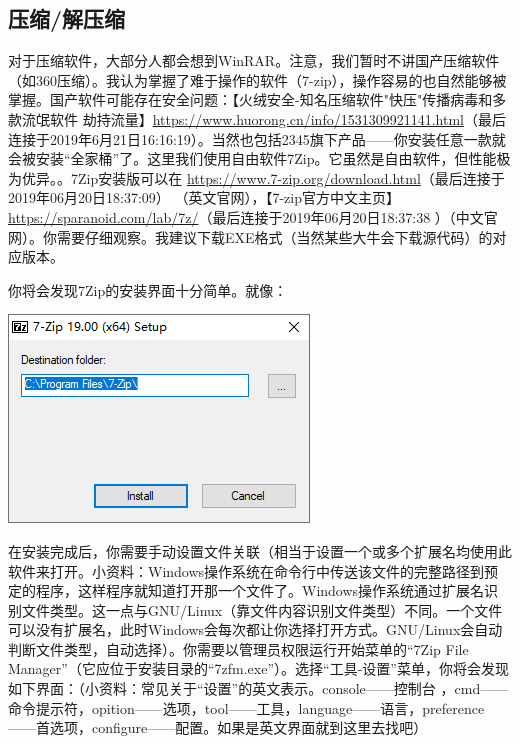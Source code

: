 \subsection{压缩/解压缩}
对于压缩软件，大部分人都会想到WinRAR。注意，我们暂时不讲国产压缩软件（如360压缩）。我认为掌握了难于操作的软件（7-zip），操作容易的也自然能够被掌握。国产软件可能存在安全问题：【火绒安全-知名压缩软件"快压"传播病毒和多款流氓软件 劫持流量】\url{https://www.huorong.cn/info/1531309921141.html}（最后连接于2019年6月21日16:16:19）。当然也包括2345旗下产品——你安装任意一款就会被安装“全家桶”了。这里我们使用自由软件7Zip。它虽然是自由软件，但性能极为优异。。7Zip安装版可以在 \url{https://www.7-zip.org/download.html}（最后连接于2019年06月20日18:37:09） （英文官网），【7-zip官方中文主页】\url{https://sparanoid.com/lab/7z/}（最后连接于2019年06月20日18:37:38 ）（中文官网）。你需要仔细观察。我建议下载EXE格式（当然某些大牛会下载源代码）的对应版本。\par
你将会发现7Zip的安装界面十分简单。就像：
\begin{center}
	\includegraphics[scale=0.7]{pic/7zipinst}
\end{center} \par
在安装完成后，你需要手动设置文件关联（相当于设置一个或多个扩展名均使用此软件来打开。小资料：Windows操作系统在命令行中传送该文件的完整路径到预定的程序，这样程序就知道打开那一个文件了。Windows操作系统通过扩展名识别文件类型。这一点与GNU/Linux（靠文件内容识别文件类型）不同。一个文件可以没有扩展名，此时Windows会每次都让你选择打开方式。GNU/Linux会自动判断文件类型，自动选择）。你需要以管理员权限运行开始菜单的“7Zip File Manager”（它应位于安装目录的“7zfm.exe”）。选择“工具-设置”菜单，你将会发现如下界面：（小资料：常见关于“设置”的英文表示。console——控制台 ，cmd——命令提示符，opition——选项，tool——工具，language——语言，preference——首选项，configure——配置。如果是英文界面就到这里去找吧）
